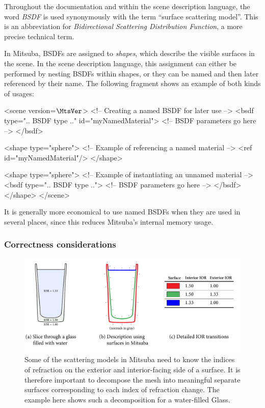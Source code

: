 Throughout the documentation and within the scene description 
language,  the word \emph{BSDF} is used synonymously with the term ``surface
scattering model''. This is an abbreviation for \emph{Bidirectional 
Scattering Distribution Function}, a more precise technical 
term. 

In Mitsuba, BSDFs are 
assigned to \emph{shapes}, which describe the visible surfaces in
the scene. In the scene description language, this assignment can
either be performed by nesting BSDFs within shapes, or they can 
be named and then later referenced by their name. 
The following fragment shows an example of both kinds of usages:
\begin{xml}
<scene version=$\MtsVer$>
	<!-- Creating a named BSDF for later use -->
	<bsdf type=".. BSDF type .." id="myNamedMaterial">
		<!-- BSDF parameters go here -->
	</bsdf>

	<shape type="sphere">
		<!-- Example of referencing a named material -->
		<ref id="myNamedMaterial"/>
	</shape>

	<shape type="sphere">
		<!-- Example of instantiating an unnamed material -->
		<bsdf type=".. BSDF type ..">
			<!-- BSDF parameters go here -->
		</bsdf>
	</shape>
</scene>
\end{xml}
It is generally more economical to use named BSDFs when they
are used in several places, since this reduces Mitsuba's internal
memory usage.
\subsubsection*{Correctness considerations}
\begin{figure}[b!]
\centering
\vspace{-5mm}
\includegraphics[width=15cm]{images/glass_explanation.pdf}
\vspace{-5mm}
\caption{
	\label{fig:glass-explanation}
	Some of the scattering models in Mitsuba need to know
	the indices of refraction on the exterior and interior-facing
	side of a surface. 
	It is therefore important to decompose the mesh into meaningful
	separate surfaces corresponding to each index of refraction change.
	The example here shows such a decomposition for a water-filled Glass.
}
\end{figure}

